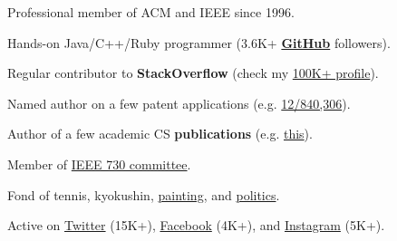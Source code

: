 \documentclass{yb}
\begin{document}
Professional member of ACM and IEEE since 1996.

Hands-on Java/C++/Ruby programmer
  (3.6K+ \textbf{\href{https://github.com/yegor256}{GitHub}} followers).

Regular contributor to \textbf{StackOverflow}
  (check my \href{https://stackexchange.com/users/63162/yegor256}{100K+ profile}).

Named author on a few patent applications
  (e.g. \href{https://www.google.com/patents/US20120023476}{12/840,306}).

Author of a few academic CS \textbf{publications}
  (e.g. \href{https://link.springer.com/chapter/10.1007/978-3-642-02152-7_6}{this}).

Member of \href{http://standards.ieee.org/develop/wg/730.html}{IEEE 730 committee}.

Fond of
  tennis,
  kyokushin,
  \href{https://www.yegor256.com/paintings.html}{painting},
  and
  \href{https://ru.yegor256.com}{politics}.

Active on
  \href{https://twitter.com/intent/follow?screen_name=yegor256}{Twitter} (15K+),
  \href{https://www.facebook.com/yegor256}{Facebook} (4K+),
  and
  \href{https://instagram.com/yegor256}{Instagram} (5K+).
\end{document}
